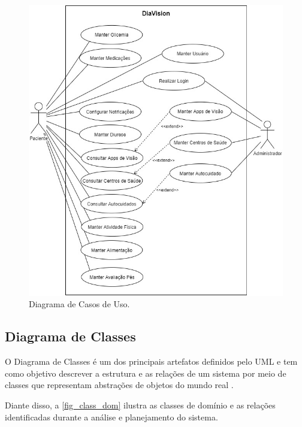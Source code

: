 \begin{figure}[htb]
    \caption{\label{fig_use_cas}Diagrama de Casos de Uso.}
    \begin{center}
        \includegraphics[scale=0.65]{Imagens/proposta/use_case.jpg}
    \end{center}
\end{figure}

\newpage

\subsection{Diagrama de Classes}

O  Diagrama de Classes é um dos principais artefatos definidos pelo UML e tem como objetivo
descrever a estrutura e as relações de um sistema por meio de classes que representam abstrações
de objetos do mundo real \cite{guedes2018uml}.

Diante disso, a \autoref{fig_class_dom} ilustra as classes de domínio e as relações identificadas
durante a análise e planejamento do sistema.


